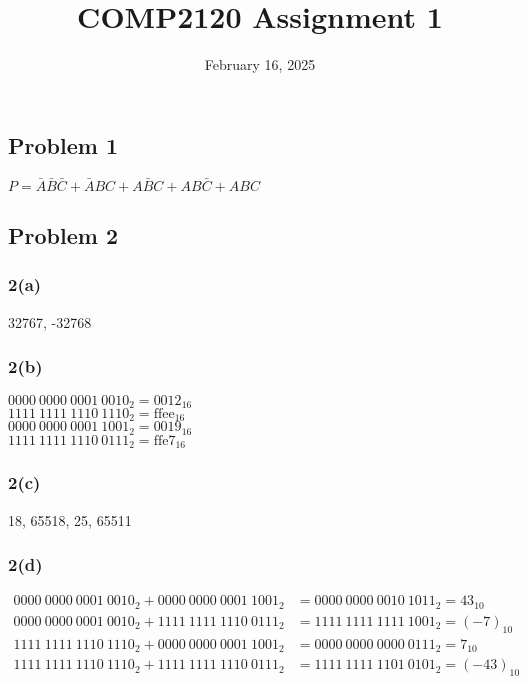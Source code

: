 \documentclass{article}
\title{COMP2120 Assignment 1}
\date{February 16, 2025}
\begin{document}
\maketitle

\subsection*{Problem 1}
$P = \bar{A}\bar{B}\bar{C} + \bar{A}BC + A\bar{B}C + AB\bar{C} + ABC$


\subsection*{Problem 2}
\subsubsection*{2(a)}
32767, -32768
\subsubsection*{2(b)}
$0000\ 0000\ 0001\ 0010_{2} = \text{0012} _{16}$  \\
$1111\ 1111\ 1110\ 1110_{2} = \text{ffee} _{16}$  \\
$0000\ 0000\ 0001\ 1001_{2} = \text{0019} _{16}$  \\
$1111\ 1111\ 1110\ 0111_{2} = \text{ffe7} _{16}$
\subsubsection*{2(c)}
18, 65518, 25, 65511
\subsubsection*{2(d)}
\begin{align*}
    0000\ 0000\ 0001\ 0010_{2} + 0000\ 0000\ 0001\ 1001_{2} & = 0000\ 0000\ 0010\ 1011_{2} = 43_{10}    \\
    0000\ 0000\ 0001\ 0010_{2} + 1111\ 1111\ 1110\ 0111_{2} & = 1111\ 1111\ 1111\ 1001_{2} = (-7)_{10}  \\
    1111\ 1111\ 1110\ 1110_{2} + 0000\ 0000\ 0001\ 1001_{2} & = 0000\ 0000\ 0000\ 0111_{2} = 7_{10}     \\
    1111\ 1111\ 1110\ 1110_{2} + 1111\ 1111\ 1110\ 0111_{2} & = 1111\ 1111\ 1101\ 0101_{2} = (-43)_{10}
\end{align*}


\newpage
\end{document}
